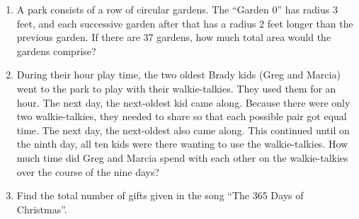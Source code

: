 \begin{problems}
\begin{enumerate}
\item A park consists of a row of circular gardens.  The ``Garden 0'' has radius 3 feet, and each successive garden after that has a radius 2 feet longer than the previous garden.  If there are 37 gardens, how much total area would the gardens comprise?

\item During their hour play time, the two oldest Brady kids (Greg and Marcia) went to the park to play with their walkie-talkies.  They used them for an hour.  The next day, the next-oldest kid came along.  Because there were only two walkie-talkies, they needed to share so that each possible pair got equal time.  The next day, the next-oldest also came along.  This continued until on the ninth day, all ten kids were there wanting to use the walkie-talkies.  How much time did Greg and Marcia spend with each other on the walkie-talkies over the course of the nine days?

\item Find the total number of gifts given in the song ``The 365 Days of Christmas''.

\end{enumerate}
\end{problems}

